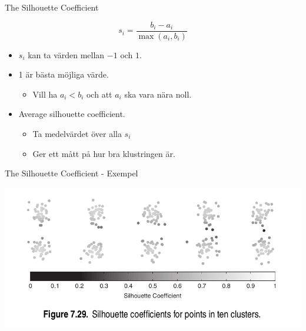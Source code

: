 \documentclass[10pt,english]{beamer}
\begin{document}
\begin{frame}{The Silhouette Coefficient}

    \begin{equation*}
        s_i = \frac{b_i - a_i}{\max(a_i, b_i)}
    \end{equation*}

    \begin{itemize}
        \item $s_i$ kan ta värden mellan $-1$ och $1$.
        \item 1 är bästa möjliga värde.
        \begin{itemize}
            \item Vill ha $a_i < b_i$ och att $a_i$ ska vara nära noll.
        \end{itemize}
        \item Average silhouette coefficient.
        \begin{itemize}
            \item Ta medelvärdet över alla $s_i$
            \item Ger ett mått på hur bra klustringen är.
        \end{itemize}
    \end{itemize}
    
\end{frame}

\begin{frame}{The Silhouette Coefficient - Exempel}

    \includegraphics[width=\textwidth]{figs/Silhouette coefficients for points in ten clusters..png}
    
\end{frame}
\end{document}
